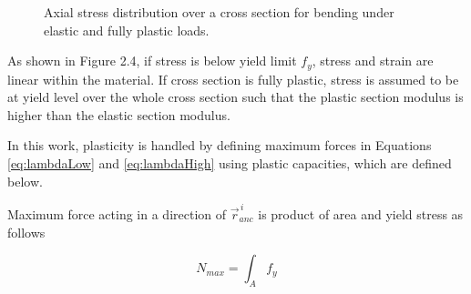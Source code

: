 \begin{figure}[htb!]
\centering
{}
\hspace{1cm}
\caption{Axial stress distribution over a cross section for bending under elastic and fully plastic loads.}
\label{fig:wp}
\end{figure}

As shown in Figure 2.4, if stress is below yield limit $f_y$, stress and strain are linear within the material.
If cross section is fully plastic, stress is assumed to be at yield level over the whole cross section such that 
the plastic section modulus is higher than the elastic section modulus.

In this work, plasticity is handled by defining maximum forces
in Equations \ref{eq:lambdaLow} and  
\ref{eq:lambdaHigh} using plastic capacities, which are defined below.

Maximum force acting in a direction of $\vec{r}_{anc}^{\,i} $
is product of area and yield stress as follows

\begin{equation} \label{eq:fN}
N_{max}= \int_A f_y
\end{equation}

